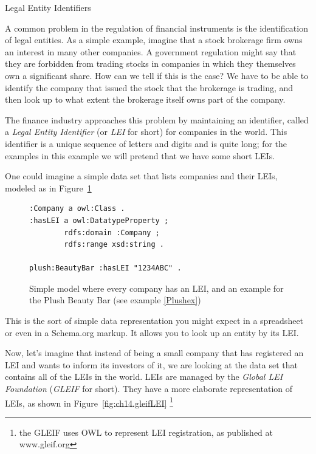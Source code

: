 \begin{challenge}{Legal Entity Identifiers}

A common problem in the regulation of financial instruments 
is the identification of legal entities.  As a simple example, 
imagine that a stock brokerage firm owns an interest in many other 
companies.  A government regulation might say that they are 
forbidden from trading 
stocks in companies in which  they themselves own a significant share.  
How can we tell if this is the case?  We have to be able to 
identify the company that issued the stock that the brokerage 
is trading, and then look up to what extent the brokerage itself
owns part of the company. 

\solution

The finance industry approaches this problem by maintaining an 
identifier, called a \emph{Legal Entity Identifier} (or \emph{LEI} for short)
for companies in the world.  This identifier is a unique sequence of 
letters and digits and is quite long; for the examples in this 
example we will pretend that we have some short LEIs. 

One could imagine a simple data set that lists companies and 
their LEIs, modeled as in Figure~\ref{fig:ch14.simpleLEI}

\begin{figure}
\begin{lstlisting}
:Company a owl:Class .
:hasLEI a owl:DatatypeProperty ;
        rdfs:domain :Company ;
        rdfs:range xsd:string .

plush:BeautyBar :hasLEI "1234ABC" .        
\end{lstlisting}
    \caption{Simple model where every company has an LEI, and an example for the Plush Beauty Bar (see example \ref{Plushex})}
    \label{fig:ch14.simpleLEI}
\end{figure}


This is the sort of simple data representation you might expect 
in a spreadsheet or even in a Schema.org markup.  It allows you 
to look up an entity by its LEI. 

Now, let's imagine that instead of being a small company that  has 
registered an LEI and wants to inform its investors 
of it, we are looking at the data set that contains all of the LEIs in the 
world.  LEIs are managed by the 
\emph{Global LEI Foundation} (\emph{GLEIF} for short).  
They have a more elaborate representation of LEIs, as shown in 
Figure~\ref{fig:ch14.gleifLEI} \footnote{the GLEIF uses OWL to represent LEI registration, as published at 
www.gleif.org}


\end{challenge}
